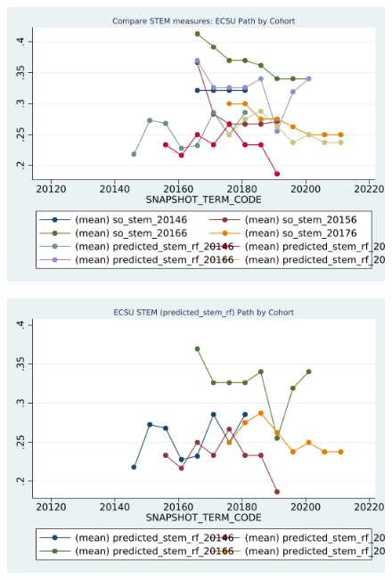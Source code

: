 \begin{figure}[h!]
\begin{centering}
\includegraphics[scale=1]{"figures/ECSU_COMPARE_path_by_cohort_CAREER_STEM"}
\end{centering}
\end{figure}
\newpage
\begin{figure}[h!]
\begin{centering}
\includegraphics[scale=1]{"figures/ECSU_predicted_stem_rf_path_by_cohort_CAREER_STEM"}
\end{centering}
\end{figure}
\newpage
